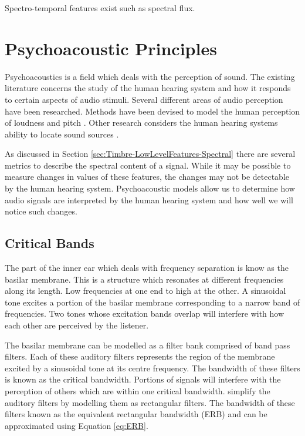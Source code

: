 		\note
		{
			Spectro-temporal features exist such as spectral flux.
		}


\section{Psychoacoustic Principles}
\label{sec:Timbre-PsychoacousticPrinciples}
	Psychoacoustics is a field which deals with the perception of sound. The existing literature concerns the study of
	the human hearing system and how it responds to certain aspects of audio stimuli. Several different areas of audio
	perception have been researched. Methods have been devised to model the human perception of loudness
	\citep{moore1997a} and pitch \citep{gerhard2003pitch}. Other research considers the human hearing systems ability to
	locate sound sources \citep{blauert1997spatial}. 

	As discussed in Section \ref{sec:Timbre-LowLevelFeatures-Spectral} there are several metrics to describe the
	spectral content of a signal. While it may be possible to measure changes in values of these features, the changes
	may not be detectable by the human hearing system. Psychoacoustic models allow us to determine how audio signals are
	interpreted by the human hearing system and how well we will notice such changes.

	\subsection{Critical Bands}
	\label{sec:Timbre-PsychoacousticPrinciples-CriticalBands}
		The part of the inner ear which deals with frequency separation is know as the basilar membrane. This is a
		structure which resonates at different frequencies along its length. Low frequencies at one end to high at
		the other. A sinusoidal tone excites a portion of the basilar membrane corresponding to a narrow band of
		frequencies. Two tones whose excitation bands overlap will interfere with how each other are perceived by
		the listener.

		The basilar membrane can be modelled as a filter bank comprised of band pass filters. Each of these
		auditory filters represents the region of the membrane excited by a sinusoidal tone at its centre
		frequency. The bandwidth of these filters is known as the critical bandwidth. Portions of signals will
		interfere with the perception of others which are within one critical bandwidth.
		\citet{glasberg1990derivation} simplify the auditory filters by modelling them as rectangular filters. The
		bandwidth of these filters known as the equivalent rectangular bandwidth (ERB) and can be approximated using
		Equation \ref{eq:ERB}.

